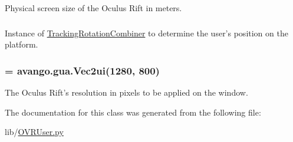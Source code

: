 \-Physical screen size of the \-Oculus \-Rift in meters. 

\hypertarget{classlib_1_1OVRUser_1_1OVRUser_ac748c2459c90d3460469c92ee29d8643}{
\subsubsection[{tracking\-\_\-rotation\-\_\-combiner}]{}}\label{classlib_1_1OVRUser_1_1OVRUser_ac748c2459c90d3460469c92ee29d8643}


\-Instance of \hyperlink{classlib_1_1OVRUser_1_1TrackingRotationCombiner}{\-Tracking\-Rotation\-Combiner} to determine the user's position on the platform. 

\hypertarget{classlib_1_1OVRUser_1_1OVRUser_a5b47ee362acca69026189c9f88b67bd5}{
\subsubsection[{window\-\_\-size}]{ = avango.\-gua.\-Vec2ui(1280, 800)}}\label{classlib_1_1OVRUser_1_1OVRUser_a5b47ee362acca69026189c9f88b67bd5}


\-The \-Oculus \-Rift's resolution in pixels to be applied on the window. 



\-The documentation for this class was generated from the following file\-:\begin{DoxyCompactItemize}
\item 
lib/\hyperlink{OVRUser_8py}{\-O\-V\-R\-User.\-py}\end{DoxyCompactItemize}
